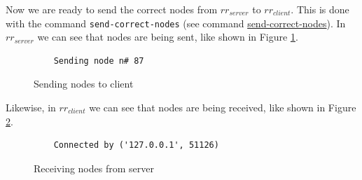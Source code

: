 Now we are ready to send the correct nodes from \(rr_{server}\) to \(rr_{client}\). This is done with the command \verb|send-correct-nodes| (see command \hyperref[command:send-correct-nodes]{send-correct-nodes}).
In \(rr_{server}\) we can see that nodes are being sent, like shown in Figure \ref{fig:sendingNode}.
\begin{figure}
    \centering
    \caption{Sending nodes to client}
    \label{fig:sendingNode}
    \begin{verbatim}
    Sending node n# 87
    \end{verbatim}
\end{figure}
Likewise, in \(rr_{client}\) we can see that nodes are being received, like shown in Figure \ref{fig:receivingNode}.
\begin{figure}
    \centering
    \caption{Receiving nodes from server}
    \label{fig:receivingNode}
    \begin{verbatim}
    Connected by ('127.0.0.1', 51126)
    \end{verbatim}
\end{figure}

